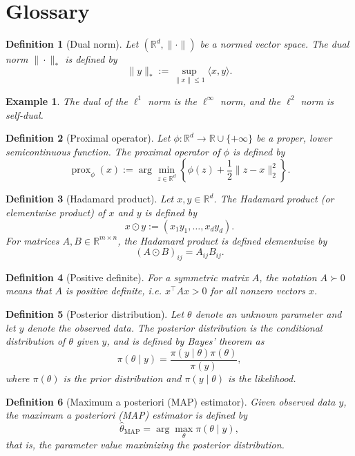 \documentclass[11pt, twoside]{report}
\newtheorem*{definition*}{Definition}
\newtheorem*{example*}{Example}
\begin{document}
\chapter*{Glossary}
\begin{definition*}[Dual norm]
Let $(\mathbb{R}^d, \|\cdot\|)$ be a normed vector space. 
The dual norm $\|\cdot\|_*$ is defined by
\[
\|y\|_* := \sup_{\|x\| \le 1} \langle x, y \rangle.
\]
\end{definition*}
\begin{example*}
The dual of the $\ell^1$ norm is the $\ell^\infty$ norm, 
and the $\ell^2$ norm is self-dual.
\end{example*}

\begin{definition*}[Proximal operator]
Let $\phi:\mathbb{R}^d\rightarrow\mathbb{R}\cup\{+\infty\}$ be a proper, lower semicontinuous function. The proximal operator of $\phi$ is defined by
\[
\operatorname{prox}_{\phi}(x)
:=
\arg\min_{z\in\mathbb{R}^d}
\left\{
\phi(z)+\frac12\|z-x\|_2^2
\right\}.
\]
\end{definition*}

\begin{definition*}[Hadamard product]
Let $x, y \in \mathbb{R}^d$. 
The Hadamard product (or elementwise product) of $x$ and $y$ is defined by
\[
x \odot y := (x_1 y_1, \dots, x_d y_d).
\]
For matrices $A, B \in \mathbb{R}^{m \times n}$, 
the Hadamard product is defined elementwise by
\[
(A \odot B)_{ij} = A_{ij} B_{ij}.
\]

\end{definition*}

\begin{definition*}[Positive definite]
For a symmetric matrix
$A$, the notation $A \succ 0$ means that $A$ is positive definite,
i.e. $x^\top A x > 0$ for all nonzero vectors $x$.
\end{definition*}

\begin{definition*}[Posterior distribution]
Let $\theta$ denote an unknown parameter and let $y$ denote the observed data. The posterior distribution is the conditional distribution of $\theta$ given $y$, and is defined by Bayes' theorem as
\[
\pi(\theta\mid y)
=
\frac{\pi(y\mid\theta)\pi(\theta)}
{\pi(y)},
\]
where $\pi(\theta)$ is the prior distribution and $\pi(y\mid\theta)$ is the likelihood.
\end{definition*}

\begin{definition*}[Maximum a posteriori (MAP) estimator]
Given observed data $y$, the maximum a posteriori (MAP) estimator is defined by
\[
\hat{\theta}_{\mathrm{MAP}}
=
\arg\max_{\theta}\pi(\theta\mid y),
\]
that is, the parameter value maximizing the posterior distribution.
\end{definition*}
\end{document}
